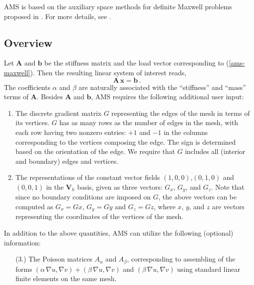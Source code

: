 AMS is based on the auxiliary space methods for definite Maxwell
problems proposed in \cite{xu_H_curl}.
For more details, see \cite{ams_jcm}.

\subsection{Overview}
Let ${\mathbf A}$ and ${\mathbf b}$ be the stiffness matrix and  the
load vector corresponding to (\ref{ams-maxwell}). Then the resulting
linear system of interest reads,
\begin{equation} \label{ams-maxwell-ls}
{\mathbf A}\, {\mathbf x} = {\mathbf b} \,.
\end{equation}
The coefficients $\alpha$ and $\beta$ are naturally associated with
the ``stiffness'' and ``mass'' terms of ${\mathbf A}$.
Besides ${\mathbf A}$ and ${\mathbf b}$, AMS requires the following
additional user input:
\begin{enumerate}
\item The discrete gradient matrix $G$ representing the edges of
the mesh in terms of its vertices. $G$ has as many rows as the number
of edges in the mesh, with each row having two nonzero entries:
$+1$ and $-1$ in the columns corresponding to the vertices composing
the edge. The sign is determined based on the orientation of the edge.
We require that $G$ includes all (interior and boundary) edges
and vertices.

\item The representations of the constant vector fields $(1,0,0)$,$(0,1,0)$ and
$(0,0,1)$ in the ${\mathbf V}_h$ basis, given as three vectors: $G_x$, $G_y$, and $G_z$.
Note that since no boundary conditions are imposed on $G$, the above vectors
can be computed as $G_x = G x$, $G_y = G y$ and $G_z = G z$, where
$x$, $y$, and $z$ are vectors representing the coordinates of the vertices of the mesh.
\end{enumerate}

In addition to the above quantities, AMS can utilize
the following (optional) information:
\begin{enumerate}
\item[(3.)] The Poisson matrices $A_\alpha$ and $A_\beta$, corresponding to
assembling of the forms $(\alpha\, \nabla u, \nabla v)+(\beta\, \nabla u, \nabla v)$
and $(\beta\, \nabla u, \nabla v)$ using standard linear finite elements on
the same mesh.
\end{enumerate}

